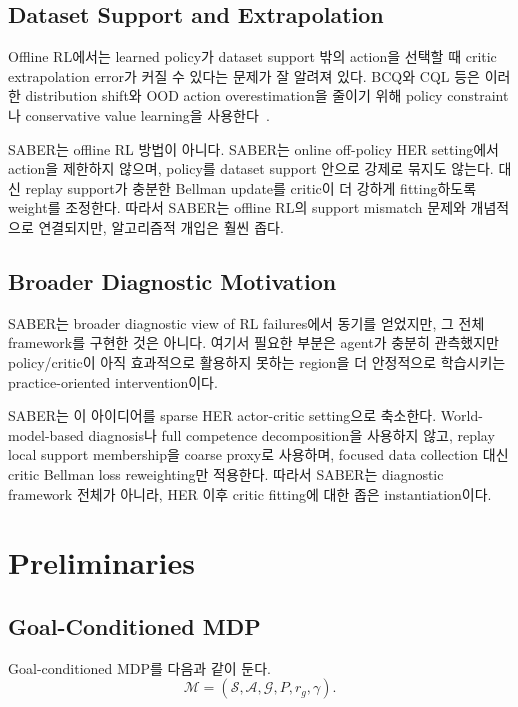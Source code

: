 \documentclass[letterpaper]{article}
\begin{document}
\subsection{Dataset Support and Extrapolation}

Offline RL에서는 learned policy가 dataset support 밖의 action을 선택할 때 critic extrapolation error가 커질 수 있다는 문제가 잘 알려져 있다. BCQ와 CQL 등은 이러한 distribution shift와 OOD action overestimation을 줄이기 위해 policy constraint나 conservative value learning을 사용한다~\citep{fujimoto2019bcq,kumar2020cql}.

SABER는 offline RL 방법이 아니다. SABER는 online off-policy HER setting에서 action을 제한하지 않으며, policy를 dataset support 안으로 강제로 묶지도 않는다. 대신 replay support가 충분한 Bellman update를 critic이 더 강하게 fitting하도록 weight를 조정한다. 따라서 SABER는 offline RL의 support mismatch 문제와 개념적으로 연결되지만, 알고리즘적 개입은 훨씬 좁다.

\subsection{Broader Diagnostic Motivation}

SABER는 broader diagnostic view of RL failures에서 동기를 얻었지만, 그 전체 framework를 구현한 것은 아니다. 여기서 필요한 부분은 agent가 충분히 관측했지만 policy/critic이 아직 효과적으로 활용하지 못하는 region을 더 안정적으로 학습시키는 practice-oriented intervention이다.

SABER는 이 아이디어를 sparse HER actor-critic setting으로 축소한다. World-model-based diagnosis나 full competence decomposition을 사용하지 않고, replay local support membership을 coarse proxy로 사용하며, focused data collection 대신 critic Bellman loss reweighting만 적용한다. 따라서 SABER는 diagnostic framework 전체가 아니라, HER 이후 critic fitting에 대한 좁은 instantiation이다.

\section{Preliminaries}

\subsection{Goal-Conditioned MDP}

Goal-conditioned MDP를 다음과 같이 둔다.
\begin{equation}
\mathcal M = (\mathcal S, \mathcal A, \mathcal G, P, r_g, \gamma).
\end{equation}
\end{document}
